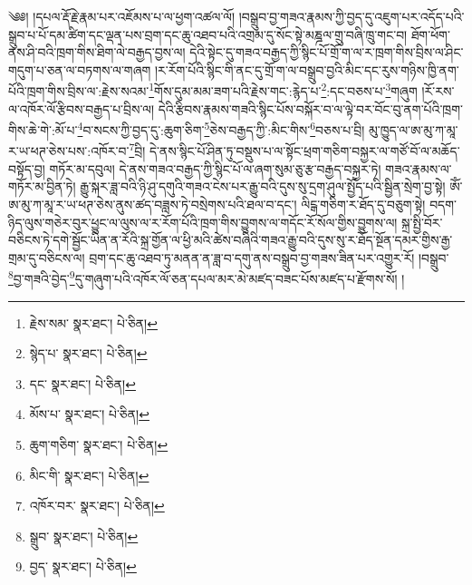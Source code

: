 \setcounter{footnote}{0} 
༄༅། །དཔལ་རྡོ་རྗེ་རྣམ་པར་འཇོམས་པ་ལ་ཕྱག་འཚལ་ལོ། །བསྒྲུབ་བྱ་གཟའ་རྣམས་ཀྱི་བྱད་དུ་འཇུག་པར་འདོད་པའི་སྒྲུབ་པ་པོ་དམ་ཚིག་དང་ལྡན་པས་བྲག་དང་ཆུ་འཐབ་པའི་འགྲམ་དུ་སོང་སྟེ་མཎྜལ་གྲུ་བཞི་ཁྲུ་གང་བ། ཐོག་ཕོག་ནས་ཤི་བའི་ཁྲག་གིས་ཐིག་ལེ་བརྒྱད་བྱས་ལ། དེའི་སྟེང་དུ་གཟའ་བརྒྱད་ཀྱི་སྙིང་པོ་གྲོ་ག་ལ་ར་ཁྲག་གིས་བྲིས་ལ་ཤིང་གདུག་པ་ཅན་ལ་བཏགས་ལ་གཞག །ར་རོག་པོའི་སྙིང་གི་ནང་དུ་གྲོ་ག་ལ་བསྒྲུབ་བྱའི་མིང་དང་རུས་གཉིས་ཁྱི་ནག་པོའི་ཁྲག་གིས་བྲིས་ལ་:རྗེས་སའམ་\footnote{རྗེས་སམ་  སྣར་ཐང་།  པེ་ཅིན། }གོས་དུམ་མམ་ཟག་པའི་རྗེས་གང་:རྙེད་པ་\footnote{སྙེད་པ་  སྣར་ཐང་།  པེ་ཅིན། }:དང་བཅས་པ་\footnote{དང་  སྣར་ཐང་།  པེ་ཅིན། }གཞུག །རོ་རས་ལ་འཁོར་ལོ་རྩིབས་བརྒྱད་པ་བྲིས་ལ། དེའི་རྩིབས་རྣམས་གཟའི་སྙིང་པོས་བསྐོར་བ་ལ་ལྟེ་བར་བོང་བུ་ནག་པོའི་ཁྲག་གིས་ཆེ་གེ་:མོ་པ་\footnote{མོས་པ་  སྣར་ཐང་།  པེ་ཅིན། }བ་སངས་ཀྱི་བྱད་དུ་:ཆུག་ཅིག་\footnote{ཆུག་གཅིག་  སྣར་ཐང་།  པེ་ཅིན། }ཅེས་བརྒྱད་ཀྱི་:མིང་གིས་\footnote{མིང་གི་  སྣར་ཐང་།  པེ་ཅིན། }བཅས་པ་བྲི། མུ་ཁྱུད་ལ་ཨ་མུ་ཀ་མཱ་ར་ཡ་ཕཊ་ཅེས་པས་:འཁོར་བ་\footnote{འཁོར་བར་  སྣར་ཐང་།  པེ་ཅིན། }བྲི། དེ་ནས་སྙིང་པོ་ཤིན་ཏུ་བསྡུས་པ་ལ་སྟོང་ཕྲག་གཅིག་བསྐྱར་ལ་གཙོ་བོ་ལ་མཆོད་བསྟོད་བྱ། གཏོར་མ་དབུལ། དེ་ནས་གཟའ་བརྒྱད་ཀྱི་སྙིང་པོ་ལ་ཞག་སུམ་ཅུ་རྩ་བརྒྱད་བསྐྱར་ཏེ། གཟའ་རྣམས་ལ་གཏོར་མ་བྱིན་ཏེ། རྒྱུ་སྐར་ཟླ་བའི་ཉི་ཤུ་དགུའི་གཟའ་ངེས་པར་རྒྱུ་བའི་དུས་སུ་དྲག་ཤུལ་སྤྱོད་པའི་སྦྱིན་སྲེག་བྱ་སྟེ། ཨོཾ་ཨ་མུ་ཀ་མཱ་ར་ཡ་ཕཊ་ཅེས་ནུས་ཚད་བཟླས་ཏེ་བསྲེགས་པའི་ཐལ་བ་དང་། ལིངྒ་གཅིག་ར་ཐོད་དུ་བཅུག་སྟེ། བདག་ཉིད་ལུས་གཅེར་བུར་ཕྱུང་ལ་ལུས་ལ་ར་རོག་པོའི་ཁྲག་གིས་བྱུགས་ལ་གདོང་རོ་སོལ་གྱིས་བྱུགས་ལ། སྐྲ་སྤྱི་བོར་བཅིངས་ཏེ་དགེ་སྦྱོང་ཡིན་ན་རོའི་སྐྲ་གྱོན་ལ་ཕྱི་མའི་ཚེས་བཞིའི་གཟའ་རྒྱུ་བའི་དུས་སུ་ར་ཐོད་སྔོན་དམར་གྱིས་རྒྱ་གྲམ་དུ་བཅིངས་ལ། བྲག་དང་ཆུ་འཐབ་ཏུ་མནན་ན་ཟླ་བ་དགུ་ནས་བསྒྲུབ་བྱ་གཟས་ཟིན་པར་འགྱུར་རོ། །བསྒྲུབ་\footnote{སྒྲུབ་  སྣར་ཐང་།  པེ་ཅིན། }བྱ་གཟའི་བྱེད་\footnote{བྱད་  སྣར་ཐང་།  པེ་ཅིན། }དུ་གཞུག་པའི་འཁོར་ལོ་ཅན་དཔལ་མར་མེ་མཛད་བཟང་པོས་མཛད་པ་རྫོགས་སོ། ། 